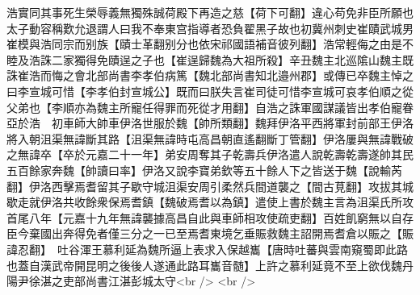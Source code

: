 浩實同其事死生榮辱義無獨殊誠荷殿下再造之慈【荷下可翻】違心苟免非臣所願也太子動容稱歎允退謂人曰我不奉東宫指導者恐負翟黑子故也初冀州刺史崔賾武城男崔模與浩同宗而别族【賾士革翻别分也依宋祁國語補音彼列翻】浩常輕侮之由是不睦及浩誅二家獨得免賾逞之子也【崔逞歸魏為大祖所殺】辛丑魏主北巡隂山魏主既誅崔浩而悔之會北部尚書李孝伯病篤【魏北部尚書知北邉州郡】或傳已卒魏主悼之曰李宣城可惜【李孝伯封宣城公】既而曰朕失言崔司徒可惜李宣城可哀孝伯順之從父弟也【李順亦為魏主所寵任得罪而死從才用翻】自浩之誅軍國謀議皆出孝伯寵眷亞於浩　初車師大帥車伊洛世服於魏【帥所類翻】魏拜伊洛平西將軍封前部王伊洛將入朝沮渠無諱斷其路【沮渠無諱時屯高昌朝直遙翻斷丁管翻】伊洛屢與無諱戰破之無諱卒【卒於元嘉二十一年】弟安周奪其子乾壽兵伊洛遣人說乾壽乾壽遂帥其民五百餘家奔魏【帥讀曰率】伊洛又說李寶弟欽等五十餘人下之皆送于魏【說輸芮翻】伊洛西擊焉耆留其子歇守城沮渠安周引柔然兵間道襲之【間古莧翻】攻拔其城歇走就伊洛共收餘衆保焉耆鎮【魏破焉耆以為鎮】遣使上書於魏主言為沮渠氏所攻首尾八年【元嘉十九年無諱襲據高昌自此與車師相攻使疏吏翻】百姓飢窮無以自存臣今棄國出奔得免者僅三分之一已至焉耆東境乞垂賑救魏主詔開焉耆倉以賑之【賑諱忍翻】　吐谷渾王慕利延為魏所逼上表求入保越巂【唐時吐蕃與雲南窺蜀即此路也蓋自漢武帝開昆明之後後人遂通此路耳巂音髄】上許之慕利延竟不至上欲伐魏丹陽尹徐湛之吏部尚書江湛彭城太守<br />
<br />
